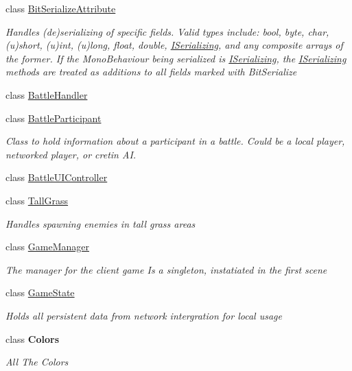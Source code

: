 \begin{DoxyCompactItemize}
\item 
class \hyperlink{class_bit_serialize_attribute}{Bit\-Serialize\-Attribute}
\begin{DoxyCompactList}\small\item\em Handles (de)serializing of specific fields. Valid types include\-: bool, byte, char, (u)short, (u)int, (u)long, float, double, \hyperlink{interface_i_serializing}{I\-Serializing}, and any composite arrays of the former. If the Mono\-Behaviour being serialized is \hyperlink{interface_i_serializing}{I\-Serializing}, the \hyperlink{interface_i_serializing}{I\-Serializing} methods are treated as additions to all fields marked with Bit\-Serialize \end{DoxyCompactList}\item 
class \hyperlink{class_battle_handler}{Battle\-Handler}
\item 
class \hyperlink{class_battle_participant}{Battle\-Participant}
\begin{DoxyCompactList}\small\item\em Class to hold information about a participant in a battle. Could be a local player, networked player, or cretin A\-I. \end{DoxyCompactList}\item 
class \hyperlink{class_battle_u_i_controller}{Battle\-U\-I\-Controller}
\item 
class \hyperlink{class_tall_grass}{Tall\-Grass}
\begin{DoxyCompactList}\small\item\em Handles spawning enemies in tall grass areas \end{DoxyCompactList}\item 
class \hyperlink{class_game_manager}{Game\-Manager}
\begin{DoxyCompactList}\small\item\em The manager for the client game Is a singleton, instatiated in the first scene \end{DoxyCompactList}\item 
class \hyperlink{class_game_state}{Game\-State}
\begin{DoxyCompactList}\small\item\em Holds all persistent data from network intergration for local usage \end{DoxyCompactList}\item 
class {\bfseries Colors}
\begin{DoxyCompactList}\small\item\em All The Colors \end{DoxyCompactList}\item 

\end{DoxyCompactItemize}

